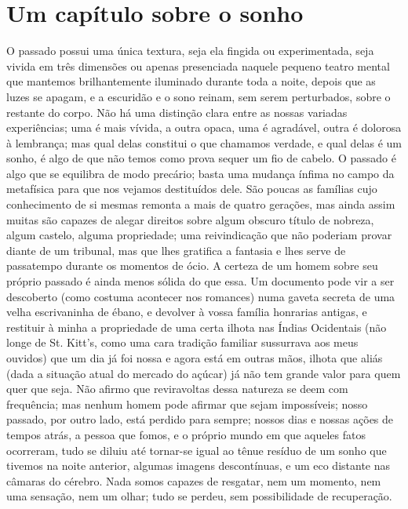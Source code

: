 \chapter[Um capítulo sobre o sonho --- R.L.~Stevenson]{Um capítulo sobre o sonho}

\clearpage

O passado possui uma única textura, seja ela fingida ou experimentada,
seja vivida em três dimensões ou apenas presenciada naquele pequeno
teatro mental que mantemos brilhantemente iluminado durante toda a
noite, depois que as luzes se apagam, e a escuridão e o sono reinam,
sem serem perturbados, sobre o restante do corpo.  Não há uma distinção
clara entre as nossas variadas experiências; uma é mais vívida, a outra
opaca, uma é agradável, outra é dolorosa à lembrança; mas qual delas
constitui o que chamamos verdade, e qual delas é um sonho, é algo de
que não temos como prova sequer um fio de cabelo.  O passado é algo que
se equilibra de modo precário; basta uma mudança ínfima no campo da
metafísica para que nos vejamos destituídos dele.  São poucas as
famílias cujo conhecimento de si mesmas remonta a mais de quatro
gerações, mas ainda assim muitas são capazes de alegar direitos sobre
algum obscuro título de nobreza, algum castelo, alguma propriedade; uma
reivindicação que não poderiam provar diante de um tribunal, mas que
lhes gratifica a fantasia e lhes serve de passatempo durante os
momentos de ócio.  A certeza de um homem sobre seu próprio passado é
ainda menos sólida do que essa.  Um documento pode vir a ser descoberto
(como costuma acontecer nos romances) numa gaveta secreta de uma velha
escrivaninha de ébano, e devolver à vossa família honrarias antigas, e
restituir à minha a propriedade de uma certa ilhota nas Índias
Ocidentais (não longe de St. Kitt’s, como uma cara tradição familiar
sussurrava aos meus ouvidos) que um dia já foi nossa e agora está em
outras mãos, ilhota que aliás (dada a situação atual do mercado do
açúcar) já não tem grande valor para quem quer que seja.  Não afirmo
que reviravoltas dessa natureza se deem com frequência; mas nenhum
homem pode afirmar que sejam impossíveis;  nosso passado, por outro
lado, está perdido para sempre; nossos dias e nossas ações de tempos
atrás, a pessoa que fomos, e o próprio mundo em que aqueles fatos
ocorreram, tudo se diluiu até tornar-se igual ao tênue resíduo de um
sonho que tivemos na noite anterior, algumas imagens descontínuas, e um
eco distante nas câmaras do cérebro.  Nada somos capazes de resgatar,
nem um momento, nem uma sensação, nem um olhar; tudo se perdeu, sem
possibilidade de recuperação.

